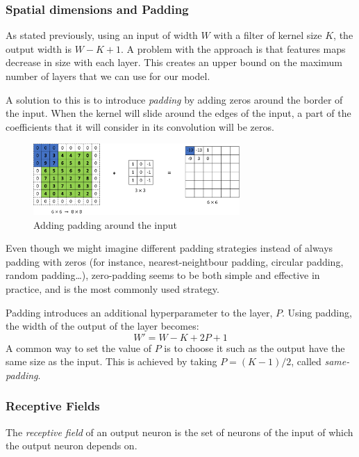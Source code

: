 \subsubsection{Spatial dimensions and Padding}
As stated previously, using an input of width $W$ with a filter of kernel size $K$, the output width is $W-K+1$. A problem with the approach is that features maps decrease in size with each layer. This creates an upper bound on the maximum number of layers that we can use for our model. 

A solution to this is to introduce \emph{padding} by adding zeros around the border of the input. When the kernel will slide around the edges of the input, a part of the coefficients that it will consider in its convolution will be zeros.
\begin{figure}[H]
    \centering
    \includegraphics[width=0.7\textwidth]{images/padding.png}
    \caption{Adding padding around the input}
\end{figure}

\begin{remark}
    Even though we might imagine different padding strategies instead of always padding with zeros (for instance, nearest-neightbour padding, circular padding, random padding\dots), zero-padding seems to be both simple and effective in practice, and is the most commonly used strategy.
\end{remark}

Padding introduces an additional hyperparameter to the layer, $P$. 
Using padding, the width of the output of the layer becomes:
\begin{equation}
    \label{eq:output-padding}
    W'=W-K+2P+1
\end{equation}
A common way to set the value of $P$ is to choose it such as the output have the same size as the input. This is achieved by taking $P=(K-1)/2$, called \emph{same-padding}.

\subsubsection{Receptive Fields}
\begin{definition}
    The \emph{receptive field} of an output neuron is the set of neurons of the input of which the output neuron depends on.
\end{definition}

